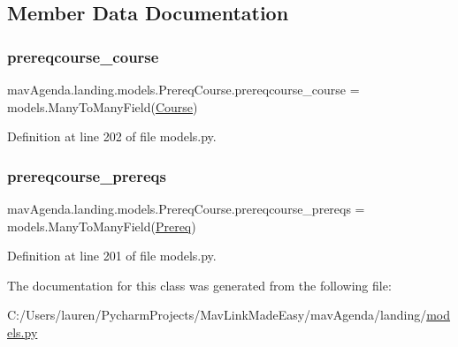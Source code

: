 \subsection{Member Data Documentation}
\mbox{\label{classmavAgenda_1_1landing_1_1models_1_1PrereqCourse_a9195ac7a561cb1f5242c56b89f5bca32}} 
\subsubsection{\texorpdfstring{prereqcourse\+\_\+course}{prereqcourse\_course}}
{\footnotesize\ttfamily mav\+Agenda.\+landing.\+models.\+Prereq\+Course.\+prereqcourse\+\_\+course = models.\+Many\+To\+Many\+Field(\mbox{\hyperlink{classmavAgenda_1_1landing_1_1models_1_1Course}{Course}})\hspace{0.3cm}{\ttfamily [static]}}



Definition at line 202 of file models.\+py.

\mbox{\label{classmavAgenda_1_1landing_1_1models_1_1PrereqCourse_ab3117e84a7c5cf97103aaa55b48b1ab9}} 
\subsubsection{\texorpdfstring{prereqcourse\+\_\+prereqs}{prereqcourse\_prereqs}}
{\footnotesize\ttfamily mav\+Agenda.\+landing.\+models.\+Prereq\+Course.\+prereqcourse\+\_\+prereqs = models.\+Many\+To\+Many\+Field(\mbox{\hyperlink{classmavAgenda_1_1landing_1_1models_1_1Prereq}{Prereq}})\hspace{0.3cm}{\ttfamily [static]}}



Definition at line 201 of file models.\+py.



The documentation for this class was generated from the following file\+:\begin{DoxyCompactItemize}
\item 
C\+:/\+Users/lauren/\+Pycharm\+Projects/\+Mav\+Link\+Made\+Easy/mav\+Agenda/landing/\mbox{\hyperlink{models_8py}{models.\+py}}\end{DoxyCompactItemize}

